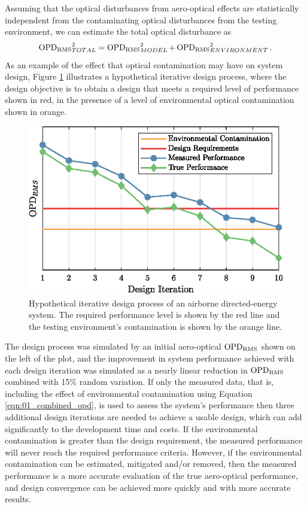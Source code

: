 Assuming that the optical disturbances from aero-optical effects are statistically independent from the contaminating optical disturbances from the testing environment, we can estimate the total optical disturbance as
\begin{equation}
  \operatorname{OPD_{RMS}}_{TOTAL}^2 = \operatorname{OPD_{RMS}}_{MODEL}^2+\operatorname{OPD_{RMS}}_{ENVIRONMENT}^2 \textrm{.}
  \label{eqn:01_combined_opd}
\end{equation}
As an example of the effect that optical contamination may have on system design, Figure \ref{fig:01_design_iteration} illustrates a hypothetical iterative design process, where the design objective is to obtain a design that meets a required level of performance shown in red, in the presence of a level of environmental optical contamination shown in orange.
\begin{figure}
  \centering
  \includegraphics{../matlab/01_introduction/design_iteration.eps}
  \caption{Hypothetical iterative design process of an airborne directed-energy system.  The required performance level is shown by the red line and the testing environment's contamination is shown by the orange line.}
  \label{fig:01_design_iteration}
\end{figure}
The design process was simulated by an initial aero-optical $\operatorname{OPD_{RMS}}$ shown on the left of the plot, and the improvement in system performance achieved with each design iteration was simulated as a nearly linear reduction in $\operatorname{OPD_{RMS}}$ combined with 15\% random variation.
If only the measured data, that is, including the effect of environmental contamination using Equation \ref{eqn:01_combined_opd}, is used to assess the system's performance then three additional design iterations are needed to achieve a usable design, which can add significantly to the development time and costs.
If the environmental contamination is greater than the design requirement, the measured performance will never reach the required performance criteria.
However, if the environmental contamination can be estimated, mitigated and/or removed, then the measured performance is a more accurate evaluation of the true aero-optical performance, and design convergence can be achieved more quickly and with more accurate results.

